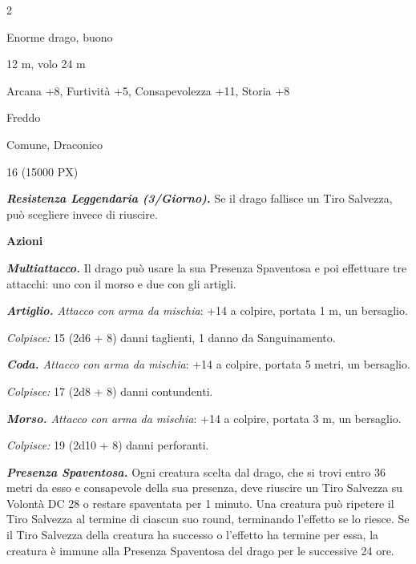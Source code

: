\begin{multicols}{2}
{
\begin{description}[noitemsep, topsep=0pt, parsep=0pt, partopsep=0pt, itemsep=1pt, leftmargin=2.35cm,  labelwidth=2.2cm, itemindent=0cm, listparindent=0pt] %
\setlength{\baselineskip}{10pt}
\item[\textbf{Taglia/Tipo}] Enorme drago, buono
\item[\textbf{Caratt.}] 
\item[\textbf{Punti Ferita}] 
\item[\textbf{Movimento}] 12 m, volo 24 m
\item[\textbf{Tiri Salvez.}] 
\item[\textbf{Comp.}] Arcana +8, Furtività +5, Consapevolezza +11, Storia +8
\item[\textbf{Imm. Danni}] Freddo
\item[\textbf{Sensi}] 
\item[\textbf{Linguaggi}] Comune, Draconico
\item[\textbf{Sfida}] 16 (15000 PX)
\end{description}
\smallskip

\emph{\textbf{Resistenza Leggendaria (3/Giorno).}} Se il drago fallisce un Tiro Salvezza, può scegliere invece di riuscire.

\textbf{Azioni}

\emph{\textbf{Multiattacco.}} Il drago può usare la sua Presenza Spaventosa e poi effettuare tre attacchi: uno con il morso e due con gli artigli.

\emph{\textbf{Artiglio.} Attacco con arma da mischia}: +14 a colpire, portata 1 m, un bersaglio.

\emph{Colpisce:} 15 (2d6 + 8) danni taglienti, 1 danno da Sanguinamento.

\emph{\textbf{Coda.} Attacco con arma da mischia}: +14 a colpire, portata 5 metri, un bersaglio.

\emph{Colpisce:} 17 (2d8 + 8) danni contundenti.

\emph{\textbf{Morso.} Attacco con arma da mischia}: +14 a colpire, portata 3 m, un bersaglio.

\emph{Colpisce:} 19 (2d10 + 8) danni perforanti.

\emph{\textbf{Presenza Spaventosa.}} Ogni creatura scelta dal drago, che si trovi entro 36 metri da esso e consapevole della sua presenza, deve riuscire un Tiro Salvezza su Volontà DC 28 o restare spaventata per 1 minuto. Una creatura può ripetere il Tiro Salvezza al termine di ciascun suo round, terminando l'effetto se lo riesce. Se il Tiro Salvezza della creatura ha successo o l'effetto ha termine per essa, la creatura è immune alla Presenza Spaventosa del drago per le successive 24 ore.

}
\end{multicols}

